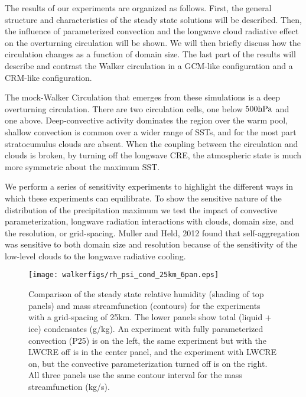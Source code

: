 \documentclass[11pt]{article}   	%
\begin{document}
The results of our experiments are organized as follows.  First, the general structure and characteristics of the steady state solutions
will be described.   Then, the influence of parameterized convection and the longwave cloud radiative effect on the overturning 
circulation will be shown.  We will then briefly discuss how the circulation changes as a function of domain size.  The last part of the
results will describe and contrast the Walker circulation in a GCM-like configuration and a CRM-like configuration.

The mock-Walker Circulation that emerges from these simulations is a deep overturning circulation.  There are two circulation cells, 
one below $500 \rm{hPa}$  and one above.  Deep-convective activity dominates the region over the warm pool, shallow convection is 
common over a wider range of SSTs, and for the most part stratocumulus 
clouds are absent.  When the coupling between the circulation and clouds is broken, by turning off the longwave CRE, the atmospheric 
state is much more symmetric about the maximum SST. 

We perform a series of sensitivity experiments to highlight the different ways in which these experiments can equilibrate.  To show the sensitive 
nature of the distribution of the precipitation maximum we test the impact of convective parameterization, 
longwave radiation interactions with clouds, domain size, 
and the resolution, or grid-spacing.    Muller and Held, 2012 found that self-aggregation was sensitive to both domain size and resolution
because of the sensitivity of the low-level clouds to the longwave radiative cooling.  

\begin{figure}
  \centering
      \texttt{[image: walkerfigs/rh\_psi\_cond\_25km\_6pan.eps]}
      \caption{Comparison of the steady state relative humidity (shading of top panels) and mass 
      streamfunction (contours) for the experiments
      with a grid-spacing of 25km.  The lower panels show total (liquid + ice) condensates (g/kg).  
      An experiment with fully parameterized convection (P25) is on the left, the same 
      experiment but with the LWCRE off is in the center panel, and the experiment with LWCRE on, but the convective
      parameterization turned off is on the right.  All three panels use the same contour interval for the mass 
      streamfunction (kg/s).}
  \label{fig:rh_psi_P25vsE25}
\end{figure}
\end{document}
